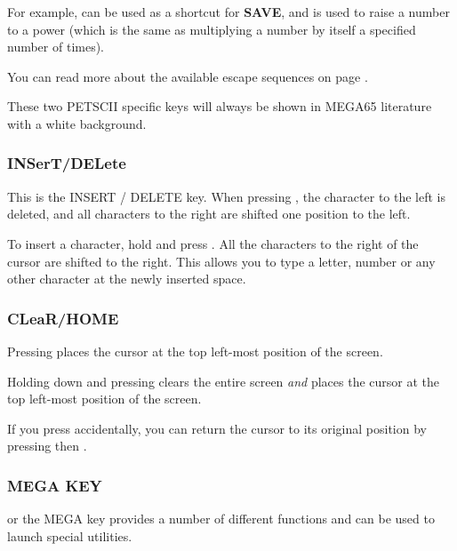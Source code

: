 For example, \megakeywhite{$\leftarrow$} can be used as a shortcut for {\bf SAVE}, and \megakeywhite{$\uparrow$} is used to raise a number to a power (which is the same as multiplying a number by itself a specified number of times).

You can read more about the available escape sequences on page \pageref{escape-sequences}.

These two PETSCII specific keys will always be shown in MEGA65 literature with a white background.

\subsubsection{INSerT/DELete}
This is the INSERT / DELETE key. When pressing , the character to the left is deleted, and all characters to the right are shifted one position to the left.

To insert a character, hold  and press . All the characters to the right of the cursor are shifted to the right. This allows you to type a letter, number or any other character at the newly inserted space.


\subsubsection{CLeaR/HOME}
Pressing  places the cursor at the top left-most position of the screen.

Holding down  and pressing  clears the entire screen {\it and} places the cursor at the top left-most position of the screen.

If you press  accidentally, you can return the cursor to its original position by pressing  then .

\subsubsection{MEGA KEY}
\megasymbolkey or the MEGA key provides a number of different functions and can be used to launch special utilities.

